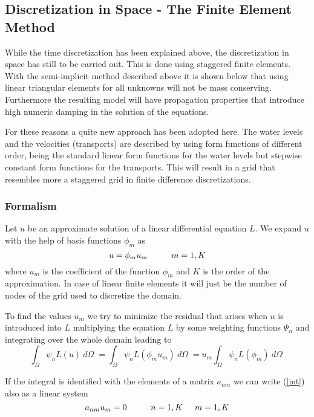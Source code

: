 \subsection{Discretization in Space - The Finite Element Method}


While the time discretization has been explained above, the discretization
in space has still to be carried out. This is done 
using staggered finite elements. 
With the semi-implicit method described above
it is shown below that using linear triangular elements
for all unknowns 
will not be mass conserving. Furthermore the resulting model
will have propagation properties that introduce high numeric damping
in the solution of the equations.

For these reasons a quite new approach has been adopted here. The water
levels and the velocities (transports) are described by using form
functions of different order, being the standard linear form functions
for the water levels but stepwise constant form functions for the
transports. This will result in a grid that resembles more a staggered
grid in finite difference discretizations.

\subsubsection{Formalism}

Let $u$ be an approximate solution of a linear differential
equation $L$. We expand $u$ with the help of basis functions $\phi_{m}$
as
\begin{equation}
\label{exp}
	u=\phi_{m} u_{m} \mbox{\hspace{1cm}} m=1,K
\end{equation}
where $u_{m}$ is the coefficient of the function $\phi_{m}$ and $K$
is the order of the approximation.
In case of linear finite
elements it will just be the number of nodes of the grid used to
discretize the domain.

To find the values $u_{m}$ we try to minimize the residual
that arises when $u$ is introduced into $L$ multiplying the equation $L$
by some weighting functions $\Psi_{n}$ and
integrating over the whole domain leading to
\begin{equation}
\label{int}
\int_{\Omega} \psi_{n} L(u) \: d\Omega \; = 
\int_{\Omega} \psi_{n} L(\phi_{m} u_{m}) \: d\Omega \;
= u_{m} \int_{\Omega} \psi_{n} L(\phi_{m}) \: d\Omega \;
\end{equation}

If the integral is identified with the elements of a matrix $a_{nm}$
we can write (\ref{int}) also as a linear system
\begin{equation} \label{sys}
	a_{nm}u_{m} = 0 \mbox{\hspace{1cm}} n=1,K \hspace{0.5cm} m=1,K
\end{equation}


